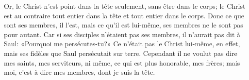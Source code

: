Or, le Christ n’est point dans la tête seulement, sans être dans le corps;
	le Christ est au contraire tout entier dans la tête
	et tout entier dans le corps.
Donc ce que sont ses membres, il l’est,
	mais ce qu’il est lui-même, ses membres ne le sont pas pour autant.
Car si ses disciples n’étaient pas ses membres, il n’aurait pas dit à Saul:
	«Pourquoi me persécutes-tu?»
Ce n’était pas le Christ lui-même, en effet,
	mais ses fidèles que Saul persécutait sur terre.
Cependant il ne voulut pas dire mes saints, mes serviteurs,
	ni même, ce qui est plus honorable, mes frères;
mais moi, c’est-à-dire mes membres, dont je suis la tête.
